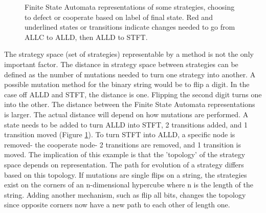 \documentclass[a4paper,11pt]{article}
\begin{document}
\begin{figure}[h]
\hfill
{}\hfill
{}\hfill
\caption{Finite State Automata representations of some strategies, choosing to defect or cooperate based on label of final state. Red and underlined states or transitions indicate changes needed to go from ALLC to ALLD, then ALLD to STFT.}
\label{fig:fsa}
\end{figure}

The strategy space (set of strategies) representable by a method is not the only important factor. 
The distance in strategy space between strategies can be defined as the number of mutations needed to turn one strategy into another. 
A possible mutation method for the binary string would be to flip a digit. 
In the case off ALLD and STFT, the distance is one. Flipping the second digit turns one into the other. 
The distance between the Finite State Automata representations is larger. 
The actual distance will depend on how mutations are performed. 
A state needs to be added to turn ALLD into STFT, 2 transitions added, and 1 transition moved (Figure \ref{fig:fsa}). 
To turn STFT into ALLD, a specific node is removed- the cooperate node- 2 transitions are removed, and 1 transition is moved. 
The implication of this example is that the 'topology' of the strategy space depends on representation. 
The path for evolution of a strategy differs based on this topology. 
If mutations are single flips on a string, the strategies exist on the corners of an n-dimensional hypercube where n is the length of the string. 
Adding another mechanism, such as flip all bits, changes the topology since opposite corners now have a new path to each other of length one.
\end{document}
